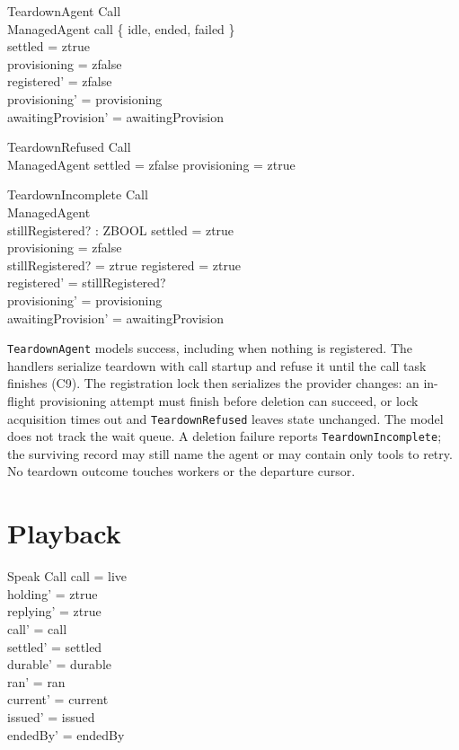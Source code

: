 \documentclass[a4paper,10pt,fleqn]{article}
\begin{document}
\begin{schema}{TeardownAgent}
  \Xi Call \\
  \Delta ManagedAgent
\where
  call \in \{ idle, ended, failed \} \\
  settled = ztrue \\
  provisioning = zfalse \\
  registered' = zfalse \\
  provisioning' = provisioning \\
  awaitingProvision' = awaitingProvision
\end{schema}

\begin{schema}{TeardownRefused}
  \Xi Call \\
  \Xi ManagedAgent
\where
  settled = zfalse \lor provisioning = ztrue
\end{schema}

\begin{schema}{TeardownIncomplete}
  \Xi Call \\
  \Delta ManagedAgent \\
  stillRegistered? : ZBOOL
\where
  settled = ztrue \\
  provisioning = zfalse \\
  stillRegistered? = ztrue \implies registered = ztrue \\
  registered' = stillRegistered? \\
  provisioning' = provisioning \\
  awaitingProvision' = awaitingProvision
\end{schema}

\texttt{TeardownAgent} models success, including when nothing is registered.
The handlers serialize teardown with call startup and refuse it until the
call task finishes (C9). The registration lock then serializes the provider
changes: an in-flight provisioning attempt must finish before deletion can
succeed, or lock acquisition times out and \texttt{TeardownRefused} leaves
state unchanged. The model does not track the wait queue. A deletion
failure reports \texttt{TeardownIncomplete}; the surviving record may still
name the agent or may contain only tools to retry. No teardown outcome
touches workers or the departure cursor.

\section{Playback}

\begin{schema}{Speak}
  \Delta Call
\where
  call = live \\
  holding' = ztrue \\
  replying' = ztrue \\
  call' = call \\
  settled' = settled \\
  durable' = durable \\
  ran' = ran \\
  current' = current \\
  issued' = issued \\
  endedBy' = endedBy
\end{schema}
\end{document}
